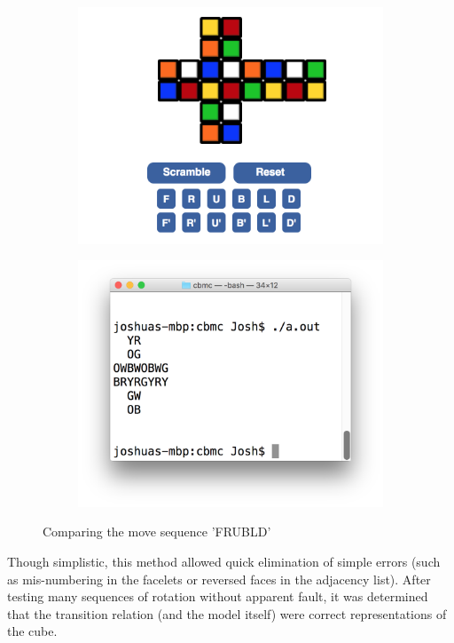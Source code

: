 \documentclass{article}
\begin{document}
\begin{figure}[h]
\begin{subfigure}{.5\textwidth}
\includegraphics[width=\textwidth]{pics/2x2x2OnlineSim_Verification.png}
\end{subfigure}
\begin{subfigure}{.5\textwidth}
\includegraphics[width=\textwidth]{pics/2x2x2Sim_Verification.png}
\end{subfigure}
\caption{Comparing the move sequence 'FRUBLD'}
\end{figure}

\noindent Though simplistic, this method allowed quick elimination of simple errors (such as mis-numbering in the facelets or reversed faces in the adjacency list). After testing many sequences of rotation without apparent fault, it was determined that the transition relation (and the model itself) were correct representations of the cube.\\
\end{document}
